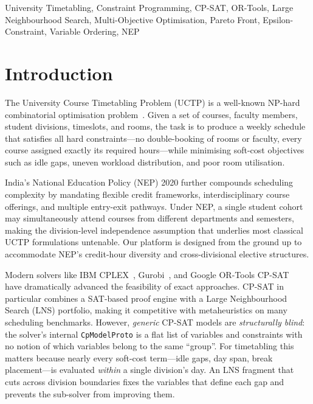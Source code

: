 \documentclass[conference]{IEEEtran}
\begin{document}
\begin{IEEEkeywords}
University Timetabling, Constraint Programming, CP-SAT, OR-Tools, Large
Neighbourhood Search, Multi-Objective Optimisation, Pareto Front,
Epsilon-Constraint, Variable Ordering, NEP
\end{IEEEkeywords}

\section{Introduction}\label{sec:intro}

The University Course Timetabling Problem (UCTP) is a well-known
NP-hard combinatorial optimisation problem~\cite{Even1975}. Given a set of
courses, faculty members, student divisions, timeslots, and rooms, the task is
to produce a weekly schedule that satisfies all hard constraints---no
double-booking of rooms or faculty, every course assigned exactly its required
hours---while minimising soft-cost objectives such as idle gaps, uneven workload
distribution, and poor room utilisation.

India's National Education Policy (NEP) 2020 further compounds scheduling
complexity by mandating flexible credit frameworks, interdisciplinary course
offerings, and multiple entry-exit pathways. Under NEP, a single student
cohort may simultaneously attend courses from different departments and
semesters, making the division-level independence assumption that underlies
most classical UCTP formulations untenable. Our platform is designed from the
ground up to accommodate NEP's credit-hour diversity and cross-divisional
elective structures.

Modern solvers like IBM CPLEX~\cite{cplex}, Gurobi~\cite{gurobi}, and Google
OR-Tools CP-SAT~\cite{ortools} have dramatically advanced the feasibility of
exact approaches. CP-SAT in particular combines a SAT-based proof engine with
a Large Neighbourhood Search (LNS) portfolio, making it competitive with
metaheuristics on many scheduling benchmarks. However, \emph{generic} CP-SAT
models are \emph{structurally blind}: the solver's internal \texttt{CpModelProto}
is a flat list of variables and constraints with no notion of which variables
belong to the same ``group''. For timetabling this matters because nearly every
soft-cost term---idle gaps, day span, break placement---is evaluated
\emph{within} a single division's day. An LNS fragment that cuts across
division boundaries fixes the variables that define each gap and prevents the
sub-solver from improving them.
\end{document}
